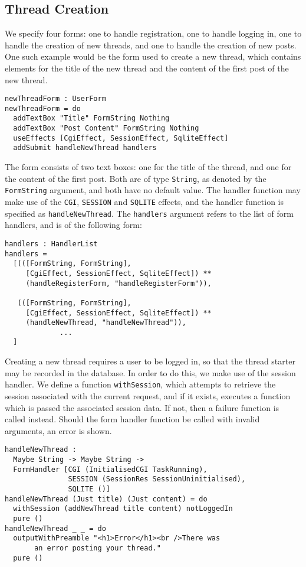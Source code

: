 \documentclass[preprint]{sigplanconf}
\begin{document}
\subsection{Thread Creation}
We specify four forms: one to handle registration, one to handle logging in, one to handle the creation of new threads, and one to handle the creation of new posts. One such example would be the form used to create a new thread, which contains elements for the title of the new thread and the content of the first post of the new thread.
\begin{Verbatim}
newThreadForm : UserForm
newThreadForm = do
  addTextBox "Title" FormString Nothing
  addTextBox "Post Content" FormString Nothing 
  useEffects [CgiEffect, SessionEffect, SqliteEffect]
  addSubmit handleNewThread handlers
\end{Verbatim}
The form consists of two text boxes: one for the title of the thread, and one for the content of the first post. Both are of type \texttt{String}, as denoted by the \texttt{FormString} argument, and both have no default value. The handler function may make use of the \texttt{CGI}, \texttt{SESSION} and \texttt{SQLITE} effects, and the handler function is specified as \texttt{handleNewThread}. The \texttt{handlers} argument refers to the list of form handlers, and is of the following form:
\begin{Verbatim}
handlers : HandlerList
handlers = 
  [(([FormString, FormString], 
     [CgiEffect, SessionEffect, SqliteEffect]) ** 
     (handleRegisterForm, "handleRegisterForm")),
               
   (([FormString, FormString], 
     [CgiEffect, SessionEffect, SqliteEffect]) ** 
     (handleNewThread, "handleNewThread")),
             ...
  ]
\end{Verbatim}
Creating a new thread requires a user to be logged in, so that the thread starter may be recorded in the database. In order to do this, we make use of the session handler. We define a function \texttt{withSession}, which attempts to retrieve the session associated with the current request, and if it exists, executes a function which is passed the associated session data. If not, then a failure function is called instead. Should the form handler function be called with invalid arguments, an error is shown.
\begin{Verbatim}
handleNewThread : 
  Maybe String -> Maybe String -> 
  FormHandler [CGI (InitialisedCGI TaskRunning), 
               SESSION (SessionRes SessionUninitialised), 
               SQLITE ()]  
handleNewThread (Just title) (Just content) = do 
  withSession (addNewThread title content) notLoggedIn
  pure ()
handleNewThread _ _ = do 
  outputWithPreamble "<h1>Error</h1><br />There was 
       an error posting your thread."
  pure ()
\end{Verbatim}
\end{document}
